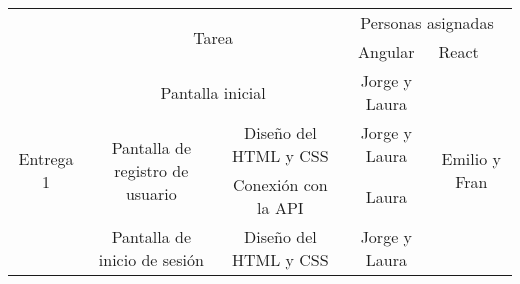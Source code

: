 \documentclass[11pt, a4paper, titlepage]{article}
\begin{document}
\begin{landscape}
\pagestyle{empty}
\begin{table}[hbt!]
\small
\centering
\begin{tabular}{c|ccll|cc|}
\cline{2-7}
\multirow{2}{*}{}                                 & \multicolumn{4}{c|}{\multirow{2}{*}{Tarea}}                                                                                                                                                                                      & \multicolumn{2}{c|}{Personas asignadas}                                      \\ \cline{6-7}
                                                  & \multicolumn{4}{c|}{}                                                                                                                                                                                                            & \multicolumn{1}{c|}{Angular}                & \multicolumn{1}{l|}{React}     \\ \hline
\multicolumn{1}{|c|}{\multirow{14}{*}{Entrega 1}} & \multicolumn{4}{c|}{Pantalla inicial}                                                                                                                                                                                            & \multicolumn{1}{c|}{Jorge y Laura}          & \multirow{9}{*}{Emilio y Fran} \\ \cline{2-6}
\multicolumn{1}{|c|}{}                            & \multicolumn{1}{c|}{\multirow{2}{*}{Pantalla de registro de usuario}}                                           & \multicolumn{3}{c|}{Diseño del HTML y CSS}                                                                     & \multicolumn{1}{c|}{Jorge y Laura}          &                                \\ \cline{3-6}
\multicolumn{1}{|c|}{}                            & \multicolumn{1}{c|}{}                                                                                           & \multicolumn{3}{c|}{Conexión con la API}                                                                       & \multicolumn{1}{c|}{Laura}                  &                                \\ \cline{2-6}
\multicolumn{1}{|c|}{}                            & \multicolumn{1}{c|}{\multirow{2}{*}{Pantalla de inicio de sesión}}                                              & \multicolumn{3}{c|}{Diseño del HTML y CSS}                                                                     & \multicolumn{1}{c|}{Jorge y Laura}          &                                \\ \cline{3-6}

\end{tabular}
\end{table}
\end{landscape}
\end{document}
